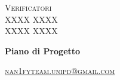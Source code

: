 \documentclass[8pt]{article}
\begin{document}
\begin{titlepage}
\begin{minipage}[t]{0.47\textwidth}
{		}
		\vspace{8mm}
		
		{\large{\textsc{Verificatori}}
			\vspace{3mm}
			{\\\large{\textsc{XXXX XXXX}\\}}
			{\large{\textsc{XXXX XXXX}}}
			
		}
		\vspace{4mm}\vspace{4mm}
	\end{minipage}
	\vspace{4cm}
	\begin{center}
		\begin{flushright}
			{\fontsize{30pt}{52pt}\selectfont \textbf{Piano di Progetto\\}} %
		\end{flushright}
		\vspace{3cm}
	\end{center}
	\vspace{9cm}
	{\small \textsc{\href{mailto: nan1fyteam.unipd@gmail.com}{\color{black}nan1fyteam.unipd@gmail.com}}}
\end{titlepage}
\pagestyle{mystyle}
\end{document}
